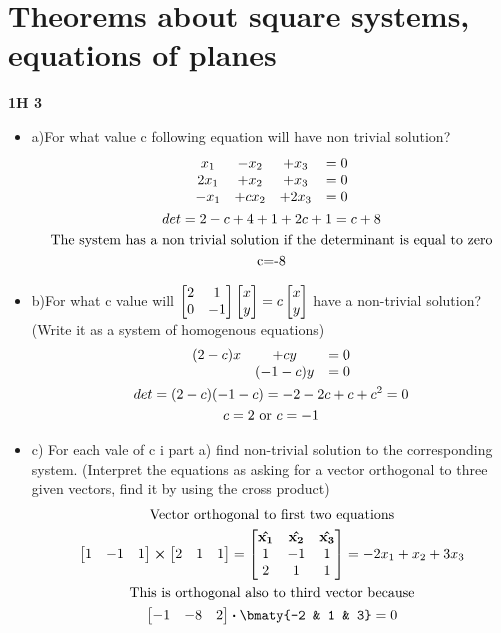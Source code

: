 \documentclass[11pt]{article}
\begin{document}
    \section{Theorems about square systems, equations of planes}
    \begin{problem}
        \textbf{1H 3}
        \begin{itemize}
            \item a)For what value c following equation will have non trivial solution?\\
            \begin{gather*}
                \mqty{x_1 & - x_2 & + x_3 & = 0\\
                2x_1 & + x_2 & + x_3 & = 0 \\
                -x_1 & + cx_2 & + 2x_3 & =0}\\
                det=2-c +4 +1 +2c +1 = c +8\\
                \text{The system has a non trivial solution if the determinant is equal to zero}\\
                $c=-8$
            \end{gather*}
            \item b)For what c value will $\bmqty{2 & 1 \\0 & -1}\bmqty{x \\ y}=c \bmqty{x \\ y}$  have a non-trivial solution? (Write it as a system of homogenous equations)\\
            \begin{gather*}
                \mqty{(2-c)x & +cy & =0\\
                & (-1 - c)y & =0}\\
                det=(2 -c)(-1-c)=-2 -2c+c + c^2 = 0\\
                c=2 \text{ or } c=-1
            \end{gather*}
            \item c) For each vale of c i part a) find non-trivial solution to the corresponding system. (Interpret the equations as asking for a vector orthogonal to three given vectors, find it by using the cross product)\\
            \begin{gather*}
                \text{Vector orthogonal to first two equations}\\
                \bmqty{1 & -1 & 1} \cross \bmqty{2 & 1 & 1}=\bmqty{\vu{x_1} & \vu{x_2 } & \vu{x_3}\\
                1 & -1 & 1 \\
                2 & 1 & 1}=
                -2x_1 + x_2 +3 x_3 \\
                \text{This is orthogonal also to third vector because}\\
                \bmqty{-1 & -8 & 2} \vdot \bmaty{-2 & 1 & 3}=0
            \end{gather*}
        \end{itemize}
    \end{problem}
\end{document}

